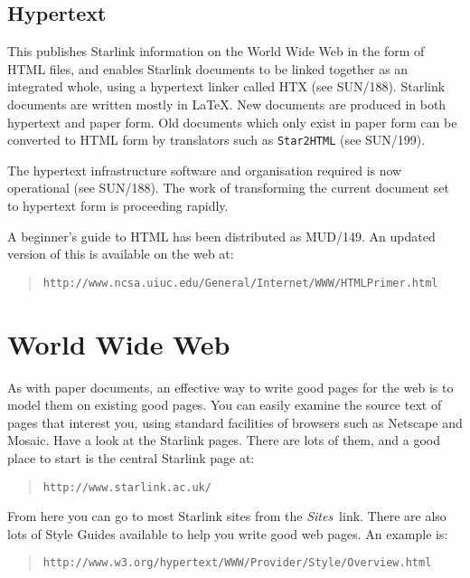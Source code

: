 \documentclass[twoside,11pt]{article}
\newcommand{\htmladdnormallink}[2]{#1}
\newcommand{\xref}[3]{#1}
\begin{document}
\subsection{Hypertext}

This publishes Starlink information on the World Wide Web in the
form of HTML files, and enables Starlink documents to be linked together
as an integrated whole, using a hypertext linker called HTX
(see \xref{SUN/188}{sun188}{}).
Starlink documents are written mostly in \LaTeX.
New documents are produced in both hypertext and paper form.
Old documents which only exist in paper form can be converted to HTML form by
translators such as {\tt Star2HTML}
(see \xref{SUN/199}{sun199}{}).

The hypertext infrastructure software and organisation required is now
operational
(see \xref{SUN/188}{sun188}{}).
The work of transforming the current document set to hypertext form is
proceeding rapidly.

A \htmladdnormallink{beginner's guide}{http://www.ncsa.uiuc.edu/General/Internet/WWW/HTMLPrimer.html}
to HTML has been distributed as MUD/149.
An updated version of this is available on the web at:
\begin{quote}
{\tt http://www.ncsa.uiuc.edu/General/Internet/WWW/HTMLPrimer.html}
\end{quote}

\section{World Wide Web}

As with paper documents, an effective way to write good pages for the web
is to model them on existing good pages.
You can easily examine the source text of pages that interest you, using
standard facilities of browsers such as Netscape and Mosaic.
Have a look at the Starlink pages.
There are lots of them, and a good place to start is the
\htmladdnormallink{central Starlink page}{http://www.starlink.ac.uk/} at:
\begin{quote}
{\tt http://www.starlink.ac.uk/}
\end{quote}
From here you can go to most Starlink sites from the {\em Sites}\, link.
There are also lots of Style Guides available to help you write good web pages.
An \htmladdnormallink{example}{http://www.w3.org/hypertext/WWW/Provider/Style/Overview.html} is:
\begin{quote}
{\tt http://www.w3.org/hypertext/WWW/Provider/Style/Overview.html}
\end{quote}
\end{document}
